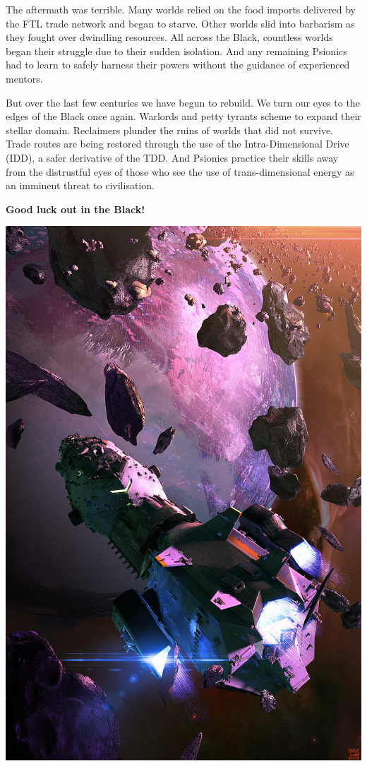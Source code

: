 \documentclass[10pt,twoside]{article}
\begin{document}
\begin{multicols}{2}
  The aftermath was terrible. Many worlds relied on the food imports delivered by the FTL trade network and began to starve. Other worlds slid into barbarism as they fought over dwindling resources. All across the Black, countless worlds began their struggle due to their sudden isolation. And any remaining Psionics had to learn to safely harness their powers without the guidance of experienced mentors.

  But over the last few centuries we have begun to rebuild. We turn our eyes to the edges of the Black once again. Warlords and petty tyrants scheme to expand their stellar domain. Reclaimers plunder the ruins of worlds that did not survive. Trade routes are being restored through the use of the Intra-Dimensional Drive (IDD), a safer derivative of the TDD. And Psionics practice their skills away from the distrustful eyes of those who see the use of trans-dimensional energy as an imminent threat to civilisation.

  \textbf{Good luck out in the Black!}

  \vspace{\baselineskip}

  \includegraphics[width=\linewidth]{rebellion_of_stars___starship_blackbeard_by_hideyoshi-d8p607x}
  

  \newpage

  \tableofcontents
  
  \end{multicols}
  
\end{document}
